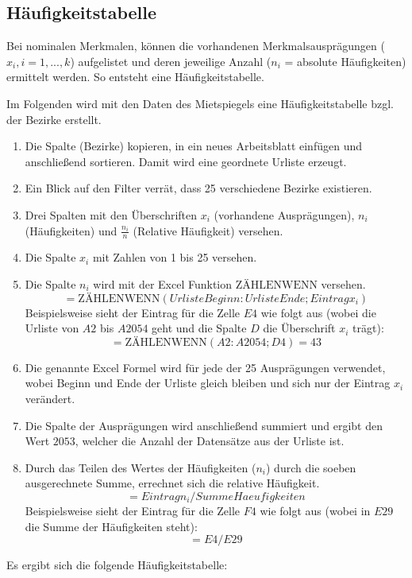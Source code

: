\subsection{Häufigkeitstabelle}
Bei nominalen Merkmalen, können die vorhandenen Merkmalsausprägungen ($x_i,i=1,...,k$) aufgelistet
und deren jeweilige Anzahl ($n_i$ = absolute Häufigkeiten) ermittelt werden.
So entsteht eine Häufigkeitstabelle.

Im Folgenden wird mit den Daten des Mietspiegels eine Häufigkeitstabelle bzgl. der Bezirke erstellt.

\begin{enumerate}
  \item Die Spalte  (Bezirke) kopieren, in ein neues Arbeitsblatt einfügen und anschließend
  sortieren. Damit wird eine geordnete Urliste erzeugt.
  \item Ein Blick auf den Filter verrät, dass 25 verschiedene Bezirke existieren.
  \item Drei Spalten mit den Überschriften $x_i$ (vorhandene Ausprägungen), $n_i$ (Häufigkeiten) und
  $\frac{n_i}{n}$ (Relative Häufigkeit) versehen.
  \item Die Spalte $x_i$ mit Zahlen von 1 bis 25 versehen.
  \item Die Spalte $n_i$ wird mit der Excel Funktion $\text{ZÄHLENWENN}$ versehen.
  \[=\text{ZÄHLENWENN}(UrlisteBeginn:UrlisteEnde;Eintrag x_i)\] Beispielsweise sieht der
  Eintrag für die Zelle $E4$ wie folgt aus (wobei die Urliste von $A2$ bis $A2054$ geht und
  die Spalte $D$ die Überschrift $x_i$ trägt): \[=\text{ZÄHLENWENN}(A2:A2054;D4)=43\]
  \item Die genannte Excel Formel wird für jede der 25 Ausprägungen verwendet, wobei Beginn und Ende
  der Urliste gleich bleiben und sich nur der Eintrag $x_i$ verändert.
  \item Die Spalte der Ausprägungen wird anschließend summiert und ergibt den Wert $2053$, welcher
  die Anzahl der Datensätze aus der Urliste ist.
  \item Durch das Teilen des Wertes der Häufigkeiten ($n_i$) durch die soeben
  ausgerechnete Summe, errechnet sich die relative Häufigkeit. \[=Eintrag n_i/SummeHaeufigkeiten\]
  Beispielsweise sieht der Eintrag für die Zelle $F4$ wie folgt aus (wobei in $E29$ die Summe der
  Häufigkeiten steht): \[=E4/E29\]
\end{enumerate} 

\newpage
Es ergibt sich die folgende Häufigkeitstabelle:

